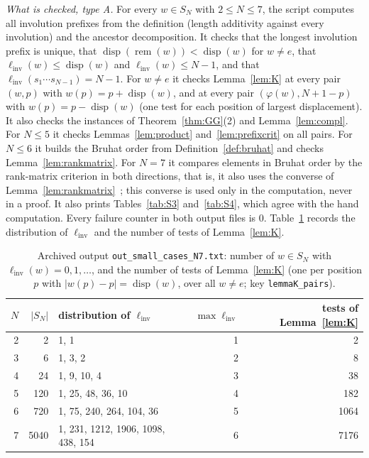 \documentclass[11pt]{amsart}
\theoremstyle{definition}
\theoremstyle{remark}
\numberwithin{equation}{section}
\newcommand{\linv}{\ell_{\mathrm{inv}}}
\newcommand{\abs}[1]{\lvert #1\rvert}
\DeclareMathOperator{\rem}{rem}
\DeclareMathOperator{\disp}{disp}
\begin{document}
\emph{What is checked, type A.} For every \(w\in S_N\) with \(2\le N\le7\), the script computes all involution prefixes from the definition (length additivity against every involution) and the ancestor decomposition. It checks that the longest involution prefix is unique, that \(\disp(\rem(w))<\disp(w)\) for \(w\neq e\), that \(\linv(w)\le\disp(w)\) and \(\linv(w)\le N-1\), and that \(\linv(s_1\cdots s_{N-1})=N-1\). For \(w\neq e\) it checks Lemma~\ref{lem:K} at every pair \((w,p)\) with \(w(p)=p+\disp(w)\), and at every pair \((\varphi(w),N+1-p)\) with \(w(p)=p-\disp(w)\) (one test for each position of largest displacement). It also checks the instances of Theorem~\ref{thm:GG}(2) and Lemma~\ref{lem:compl}. For \(N\le5\) it checks Lemmas~\ref{lem:product} and~\ref{lem:prefixcrit} on all pairs. For \(N\le6\) it builds the Bruhat order from Definition~\ref{def:bruhat} and checks Lemma~\ref{lem:rankmatrix}. For \(N=7\) it compares elements in Bruhat order by the rank-matrix criterion in both directions, that is, it also uses the converse of Lemma~\ref{lem:rankmatrix}~\cite[Ch.~2]{BB}; this converse is used only in the computation, never in a proof. It also prints Tables~\ref{tab:S3} and~\ref{tab:S4}, which agree with the hand computation. Every failure counter in both output files is \(0\). Table~\ref{tab:hist} records the distribution of \(\linv\) and the number of tests of Lemma~\ref{lem:K}.

\begin{table}[ht]
\centering
\small
\caption{Archived output \texttt{out\_small\_cases\_N7.txt}: number of \(w\in S_N\) with \(\linv(w)=0,1,\dots\), and the number of tests of Lemma~\ref{lem:K} (one per position \(p\) with \(\abs{w(p)-p}=\disp(w)\), over all \(w\neq e\); key \texttt{lemmaK\_pairs}).}\label{tab:hist}
\begin{tabular}{rrlrr}
\toprule
\(N\) & \(\abs{S_N}\) & distribution of \(\linv\) & \(\max\linv\) & tests of Lemma~\ref{lem:K}\\
\midrule
2 & 2 & 1, 1 & 1 & 2\\
3 & 6 & 1, 3, 2 & 2 & 8\\
4 & 24 & 1, 9, 10, 4 & 3 & 38\\
5 & 120 & 1, 25, 48, 36, 10 & 4 & 182\\
6 & 720 & 1, 75, 240, 264, 104, 36 & 5 & 1064\\
7 & 5040 & 1, 231, 1212, 1906, 1098, 438, 154 & 6 & 7176\\
\bottomrule
\end{tabular}
\end{table}
\end{document}
